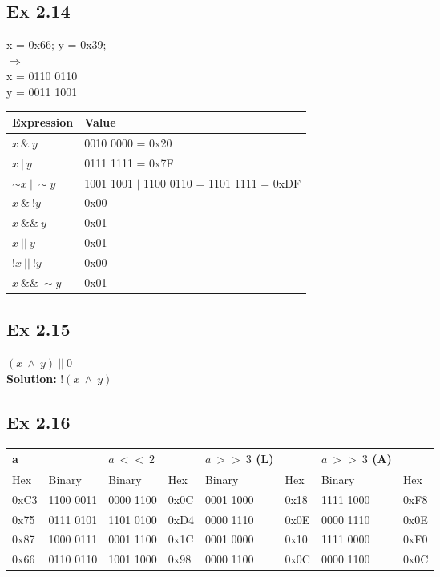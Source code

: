 \subsection{Ex 2.14}
x = 0x66; y = 0x39;\\
$\Rightarrow$\\
x = 0110 0110\\
y = 0011 1001
\begin{table}[h]
    \centering
    \begin{tabular}{ll}
        \toprule
        Expression & Value \\
        \midrule
        $x\ \&\ y$ & 0010 0000 = 0x20\\
        $x\ |\ y$ & 0111 1111 = 0x7F\\
        $\sim x \ |\ \sim y$ & 1001 1001 $|$ 1100 0110 = 1101 1111 = 0xDF\\
        $x\ \&\ !y$ & 0x00\\
        $x\ \&\&\ y$ & 0x01\\
        $x\ ||\ y$ & 0x01\\
        $!x\ ||\ !y$ & 0x00\\
        $x\ \&\&\ \sim y$ & 0x01\\
        \bottomrule
    \end{tabular}
\end{table}

\subsection{Ex 2.15}
$(x\ \land\ y)\ ||\ 0$\\
{\color{red}\textbf{Solution: } $!(x\ \land\ y)$}

\subsection{Ex 2.16}
\begin{table}[h]
    \centering
    \begin{tabular}{llllllll}
        \toprule
        a && $a\ <<\ 2$ && $a\ >>\ 3$ (L) && $a\ >>\ 3$ (A)\\
        \midrule
        Hex & Binary & Binary & Hex & Binary & Hex & Binary & Hex \\
        \midrule
        0xC3 & 1100 0011 & 0000 1100 & 0x0C & 0001 1000 & 0x18 & 1111 1000 & 0xF8\\
        0x75 & 0111 0101 & 1101 0100 & 0xD4 & 0000 1110 & 0x0E & 0000 1110 & 0x0E\\
        0x87 & 1000 0111 & 0001 1100 & 0x1C & 0001 0000 & 0x10 & 1111 0000 & 0xF0\\
        0x66 & 0110 0110 & 1001 1000 & 0x98 & 0000 1100 & 0x0C & 0000 1100 & 0x0C\\
        \bottomrule
    \end{tabular}
\end{table}

